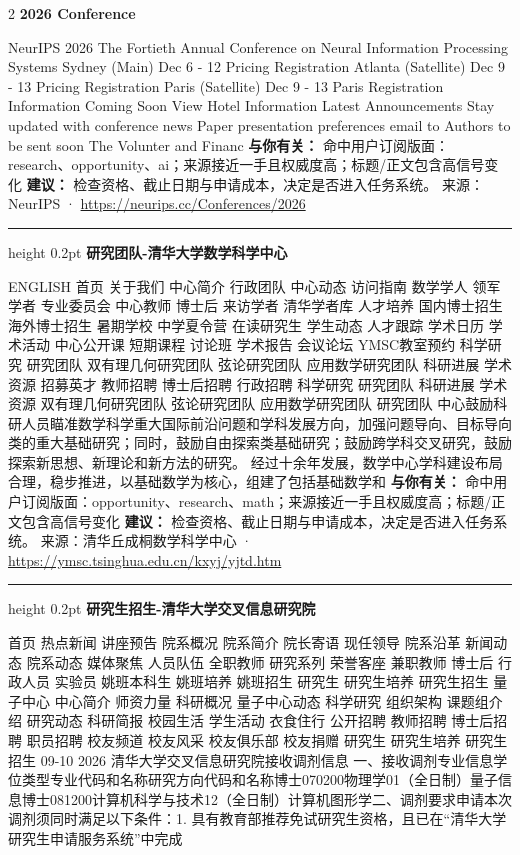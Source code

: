\documentclass[10.5pt]{ctexart}
\begin{document}
\begin{multicols}{2}
{\large\bfseries 2026 Conference}\par
NeurIPS 2026 The Fortieth Annual Conference on Neural Information Processing Systems Sydney (Main) Dec 6 - 12 Pricing Registration Atlanta (Satellite) Dec 9 - 13 Pricing Registration Paris (Satellite) Dec 9 - 13 Paris Registration Information Coming Soon View Hotel Information Latest Announcements Stay updated with conference news Paper presentation preferences email to Authors to be sent soon The Volunter and Financ
\textbf{与你有关：} 命中用户订阅版面：research、opportunity、ai；来源接近一手且权威度高；标题/正文包含高信号变化
\textbf{建议：} 检查资格、截止日期与申请成本，决定是否进入任务系统。
{\footnotesize\color{ormuted} 来源：NeurIPS · \url{https://neurips.cc/Conferences/2026}}
\vspace{2mm}
\hrule height 0.2pt
\vspace{2mm}
{\large\bfseries 研究团队-清华大学数学科学中心}\par
ENGLISH 首页 关于我们 中心简介 行政团队 中心动态 访问指南 数学学人 领军学者 专业委员会 中心教师 博士后 来访学者 清华学者库 人才培养 国内博士招生 海外博士招生 暑期学校 中学夏令营 在读研究生 学生动态 人才跟踪 学术日历 学术活动 中心公开课 短期课程 讨论班 学术报告 会议论坛 YMSC教室预约 科学研究 研究团队 双有理几何研究团队 弦论研究团队 应用数学研究团队 科研进展 学术资源 招募英才 教师招聘 博士后招聘 行政招聘 科学研究 研究团队 科研进展 学术资源 双有理几何研究团队 弦论研究团队 应用数学研究团队 研究团队 中心鼓励科研人员瞄准数学科学重大国际前沿问题和学科发展方向，加强问题导向、目标导向类的重大基础研究；同时，鼓励自由探索类基础研究；鼓励跨学科交叉研究，鼓励探索新思想、新理论和新方法的研究。 经过十余年发展，数学中心学科建设布局合理，稳步推进，以基础数学为核心，组建了包括基础数学和
\textbf{与你有关：} 命中用户订阅版面：opportunity、research、math；来源接近一手且权威度高；标题/正文包含高信号变化
\textbf{建议：} 检查资格、截止日期与申请成本，决定是否进入任务系统。
{\footnotesize\color{ormuted} 来源：清华丘成桐数学科学中心 · \url{https://ymsc.tsinghua.edu.cn/kxyj/yjtd.htm}}
\vspace{2mm}
\hrule height 0.2pt
\vspace{2mm}
{\large\bfseries 研究生招生-清华大学交叉信息研究院}\par
首页 热点新闻 讲座预告 院系概况 院系简介 院长寄语 现任领导 院系沿革 新闻动态 院系动态 媒体聚焦 人员队伍 全职教师 研究系列 荣誉客座 兼职教师 博士后 行政人员 实验员 姚班本科生 姚班培养 姚班招生 研究生 研究生培养 研究生招生 量子中心 中心简介 师资力量 科研概况 量子中心动态 科学研究 组织架构 课题组介绍 研究动态 科研简报 校园生活 学生活动 衣食住行 公开招聘 教师招聘 博士后招聘 职员招聘 校友频道 校友风采 校友俱乐部 校友捐赠 研究生 研究生培养 研究生招生 09-10 2026 清华大学交叉信息研究院接收调剂信息 一、接收调剂专业信息学位类型专业代码和名称研究方向代码和名称博士070200物理学01（全日制）量子信息博士081200计算机科学与技术12（全日制）计算机图形学二、调剂要求申请本次调剂须同时满足以下条件：1. 具有教育部推荐免试研究生资格，且已在“清华大学研究生申请服务系统”中完成

\end{multicols}
\end{document}
